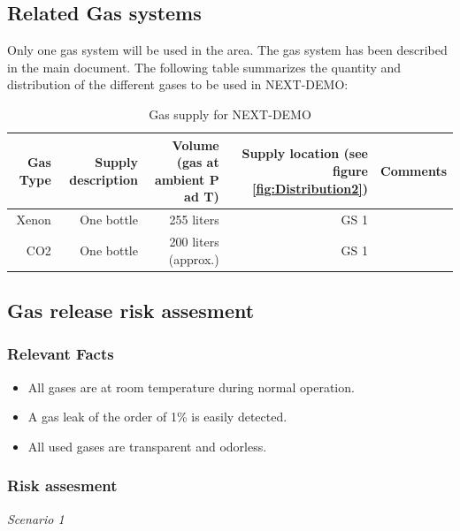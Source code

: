 \subsection{Related Gas systems}

Only one gas system will be used in the area. The gas system has been described in the main document. The following table summarizes the quantity and distribution of the different gases to be used in NEXT-DEMO:



\begin{table}[h]
\begin{tabular}{|r|r|r|r|r|}
\hline
\parbox[t]{2cm}{Gas Type} & \parbox[t]{3cm}{Supply description} &\parbox[t]{3cm}{ Volume (gas at ambient P ad T) }& \parbox[t]{3cm}{Supply location (see figure \ref{fig:Distribution2}) }& Comments \\\hline
Xenon & One bottle & 255 liters & GS 1 & \\\hline
CO2 & One bottle & 200 liters (approx.) & GS 1 &\\\hline
\end{tabular}
\caption{Gas supply for NEXT-DEMO}
\label{tab:gassupply}
\end{table}

\subsection{Gas release risk assesment}

\subsubsection{Relevant Facts}
\begin{itemize}
\item All gases are at room temperature during normal operation.
\item A gas leak of the order of 1\% is easily detected.
\item All used gases are transparent and odorless.
\end{itemize}

\subsubsection{Risk assesment}

\textit{Scenario 1}

